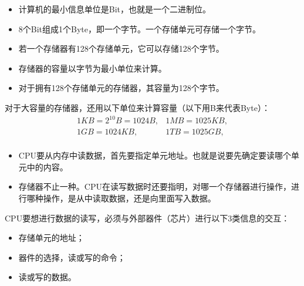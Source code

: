 \begin{frame}

  \begin{defn}[]{}
    \begin{itemize}
    \item 计算机的最小信息单位是Bit，也就是一个二进制位。
    \item 8个Bit组成1个Byte，即一个字节。一个存储单元可存储一个字节。
    \item[] 若一个存储器有128个存储单元，它可以存储128个字节。
    \item 存储器的容量以字节为最小单位来计算。
    \item[] 对于拥有128个存储单元的存储器，其容量为128个字节。 
    \end{itemize}
  \end{defn}


  对于大容量的存储器，还用以下单位来计算容量（以下用B来代表Byte）：
  $$
  \begin{array}{ll}
    1KB=2^{10}B=1024B, & 1MB=1025KB, \\
    1GB=1024KB, & 1TB=1025GB, \\
  \end{array}
  $$
\end{frame}
% 
\begin{frame}
  \begin{itemize}
  \item CPU要从内存中读数据，首先要指定单元地址。也就是说要先确定要读哪个单元中的内容。\\[0.1in]
  \item 存储器不止一种。CPU在读写数据时还要指明，对哪一个存储器进行操作，进行哪种操作，是从中读取数据，还是向里面写入数据。

  \end{itemize}
\end{frame}
% 
\begin{frame}
  CPU要想进行数据的读写，必须与外部器件（芯片）进行以下3类信息的交互： 

  \begin{itemize}
  \item 存储单元的地址；\\[0.1in]
  \item 器件的选择，读或写的命令；\\[0.1in]
  \item 读或写的数据。

  \end{itemize}
\end{frame}
